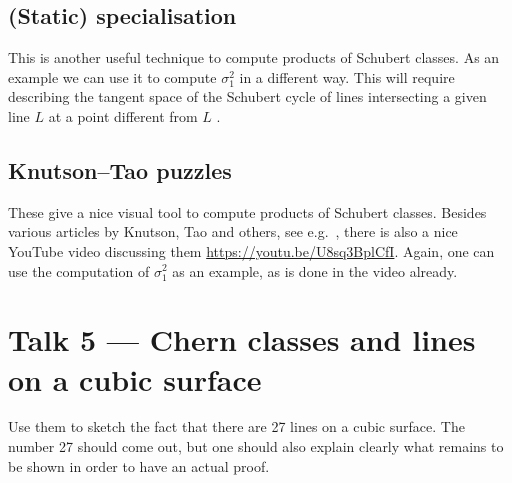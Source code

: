 \documentclass[A4paper, 12pt, british, reqno]{amsart}
\theoremstyle{plain}
\theoremstyle{definition}
\theoremstyle{remark}
\theoremstyle{plain}
\theoremstyle{definition}
\theoremstyle{remark}
\theoremstyle{plain}
\theoremstyle{definition}
\theoremstyle{remark}
\begin{document}
\subsection{(Static) specialisation \cite[\S 3.5.1]{eh16}}
This is another useful technique to compute products of Schubert classes.
As an example we can use it to compute $\sigma_{1}^{2}$ in a different way.
This will require describing the tangent space of the Schubert cycle of lines intersecting a given line $L$ at a point different from $L$ \cite[Exe.~3.26]{eh16}.

\subsection{Knutson--Tao puzzles}
These give a nice visual tool to compute products of Schubert classes.
Besides various articles by Knutson, Tao and others, see e.g.~\cite{ktw04}, there is also a nice YouTube video discussing them \href{https://youtu.be/U8sq3BplCfI}{https://youtu.be/U8sq3BplCfI}.
Again, one can use the computation of $\sigma_{1}^{2}$ as an example, as is done in the video already.

\section{Talk 5 --- Chern classes and lines on a cubic surface}

Use them to sketch the fact that there are 27 lines on a cubic surface.
The number 27 should come out, but one should also explain clearly what remains to be shown in order to have an actual proof.



\vfill
\end{document}
